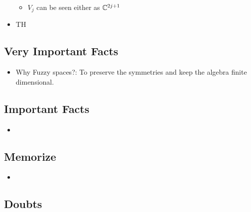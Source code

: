 \documentclass{article}
\begin{document}
\begin{itemize}
        \begin{itemize}
            
        \item $V_j$ can be seen either as $\mathbb{C}^{2j+1}$
            
        \end{itemize}
    
    \item TH
    
    \end{itemize}

\subsection{Very Important Facts}

    \begin{itemize}

    \item Why Fuzzy spaces?: To preserve the symmetries and keep the algebra finite dimensional.
    
    \end{itemize}

\subsection{Important Facts}

    \begin{itemize}

    \item 
    
    \end{itemize}

\subsection{Memorize}

    \begin{itemize}

    \item 
    
    \end{itemize}

\subsection{Doubts}
\end{document}
